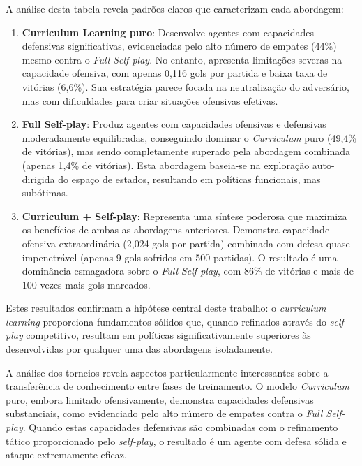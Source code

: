 A análise desta tabela revela padrões claros que caracterizam cada abordagem:

\begin{enumerate}
    \item \textbf{Curriculum Learning puro}: Desenvolve agentes com capacidades defensivas significativas, evidenciadas pelo alto número de empates (44\%) mesmo contra o \textit{Full Self-play}. No entanto, apresenta limitações severas na capacidade ofensiva, com apenas 0,116 gols por partida e baixa taxa de vitórias (6,6\%). Sua estratégia parece focada na neutralização do adversário, mas com dificuldades para criar situações ofensivas efetivas.
    
    \item \textbf{Full Self-play}: Produz agentes com capacidades ofensivas e defensivas moderadamente equilibradas, conseguindo dominar o \textit{Curriculum} puro (49,4\% de vitórias), mas sendo completamente superado pela abordagem combinada (apenas 1,4\% de vitórias). Esta abordagem baseia-se na exploração auto-dirigida do espaço de estados, resultando em políticas funcionais, mas subótimas.
    
    \item \textbf{Curriculum + Self-play}: Representa uma síntese poderosa que maximiza os benefícios de ambas as abordagens anteriores. Demonstra capacidade ofensiva extraordinária (2,024 gols por partida) combinada com defesa quase impenetrável (apenas 9 gols sofridos em 500 partidas). O resultado é uma dominância esmagadora sobre o \textit{Full Self-play}, com 86\% de vitórias e mais de 100 vezes mais gols marcados.
\end{enumerate}

Estes resultados confirmam a hipótese central deste trabalho: o \textit{curriculum learning} proporciona fundamentos sólidos que, quando refinados através do \textit{self-play} competitivo, resultam em políticas significativamente superiores às desenvolvidas por qualquer uma das abordagens isoladamente.

A análise dos torneios revela aspectos particularmente interessantes sobre a transferência de conhecimento entre fases de treinamento. O modelo \textit{Curriculum} puro, embora limitado ofensivamente, demonstra capacidades defensivas substanciais, como evidenciado pelo alto número de empates contra o \textit{Full Self-play}. Quando estas capacidades defensivas são combinadas com o refinamento tático proporcionado pelo \textit{self-play}, o resultado é um agente com defesa sólida e ataque extremamente eficaz.

